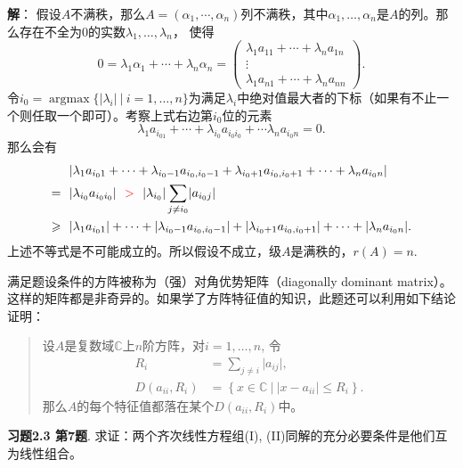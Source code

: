 {\bf 解}： 假设$A$不满秩，那么$A = (\alpha_1, \cdots, \alpha_n)$列不满秩，其中$\alpha_1, \ldots, \alpha_n$是$A$的列。那么存在不全为0的实数$\lambda_1, \ldots, \lambda_n$， 使得
$$0 = \lambda_1 \alpha_1 + \cdots + \lambda_n \alpha_n = \begin{pmatrix} \lambda_1 a_{11} + \cdots + \lambda_n a_{1n} \\ \vdots \\ \lambda_1 a_{n1} + \cdots + \lambda_n a_{nn} \end{pmatrix}.$$
令$i_0 = \operatorname{argmax} \{ \lvert \lambda_i \rvert \ |\ i = 1, \ldots, n \}$为满足$\lambda_i$中绝对值最大者的下标（如果有不止一个则任取一个即可）。考察上式右边第$i_0$位的元素
$$\lambda_{1} a_{i_01} + \cdots + \lambda_{i_0} a_{i_0i_0} + \cdots \lambda_n a_{i_0n} = 0.$$
那么会有
\begin{align*}
& ~~ \lvert \lambda_{1} a_{i_01} + \cdots + \lambda_{i_0-1} a_{i_0,i_0-1} + \lambda_{i_0+1} a_{i_0,i_0+1} + \cdots + \lambda_n a_{i_0n} \rvert \\
= & ~~ \lvert \lambda_{i_0} a_{i_0i_0} \rvert ~~ {\color{red} >} ~~ \lvert \lambda_{i_0} \rvert \sum\limits_{j\neq i_0} \lvert a_{i_0j} \rvert \\
\geqslant & ~~ \lvert \lambda_{1} a_{i_01} \rvert + \cdots + \lvert \lambda_{i_0-1} a_{i_0,i_0-1} \rvert + \lvert \lambda_{i_0+1} a_{i_0,i_0+1} \rvert + \cdots + \lvert \lambda_n a_{i_0n} \rvert.
\end{align*}
上述不等式是不可能成立的。所以假设不成立，级$A$是满秩的，$r(A) = n.$

满足题设条件的方阵被称为（强）对角优势矩阵（diagonally dominant matrix）。这样的矩阵都是非奇异的。如果学了方阵{\color{red}特征值}的知识，此题还可以利用如下结论证明：

\begin{quote}
设$A$是复数域$\mathbb{C}$上$n$阶方阵，对$i = 1, \ldots, n$, 令
\begin{align*}
R_{i} & = \sum_{j\neq {i}}\lvert a_{ij} \rvert, \\
D(a_{ii}, R_{i}) & = \left\{ x \in \mathbb{C} \ |\ \lvert x - a_{ii} \rvert \leqslant R_{i} \right\}.
\end{align*}
那么$A$的每个{\color{red}特征值}都落在某个$D(a_{ii}, R_{i})$中。
\end{quote}

\newpageorvspace

{\bf 习题2.3 第7题}. 求证：两个齐次线性方程组(I), (II)同解的充分必要条件是他们互为线性组合。

\newpageorvspace


